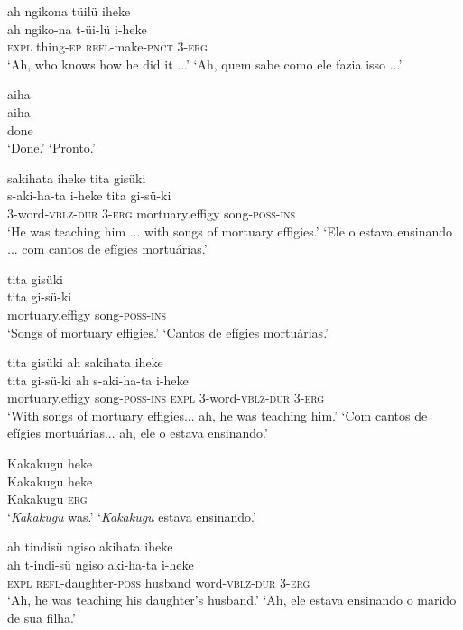 \documentclass[output=paper,
modfonts,nonflat
]{langsci/langscibook}
\begin{document}
\ea  ah ngikona tüilü iheke\\[.3em]
\gll ah ngiko-na t-üi-lü i-heke\\
     \textsc{expl} thing-\textsc{ep} \textsc{refl}-make-\textsc{pnct} 3-\textsc{erg}\\
\glt ‘Ah, who knows how he did it ...’
\glt ‘Ah, quem sabe como ele fazia isso ...’
\z

\ea  aiha\\[.3em]
\gll aiha\\
     done\\
\glt ‘Done.’
\glt ‘Pronto.’
\z

\ea  sakihata iheke tita gisüki\\[.3em]
\gll s-aki-ha-ta i-heke tita gi-sü-ki\\
     3-word-\textsc{vblz}-\textsc{dur} 3-\textsc{erg} mortuary.effigy song-\textsc{poss}-\textsc{ins}\\
\glt ‘He was teaching him ... with songs of mortuary effigies.’
\glt ‘Ele o estava ensinando ... com cantos de efígies mortuárias.’
\z

\ea  tita gisüki\\[.3em]
\gll tita gi-sü-ki\\
     mortuary.effigy song-\textsc{poss}-\textsc{ins}\\
\glt ‘Songs of mortuary effigies.’
\glt ‘Cantos de efígies mortuárias.’
\z

\ea  tita gisüki ah sakihata iheke\\[.3em]
\gll tita gi-sü-ki ah s-aki-ha-ta i-heke\\
     mortuary.effigy song-\textsc{poss}-\textsc{ins} \textsc{expl} 3-word-\textsc{vblz}-\textsc{dur} 3-\textsc{erg}\\
\glt ‘With songs of mortuary effigies... ah, he was teaching him.’
\glt ‘Com cantos de efígies mortuárias... ah, ele o estava ensinando.’
\z

\ea  Kakakugu heke\\[.3em]
\gll Kakakugu heke\\
     Kakakugu \textsc{erg}\\
\glt ‘\textit{Kakakugu} was.’
\glt ‘\textit{Kakakugu} estava ensinando.’
\z

\ea  ah tindisü ngiso akihata iheke\\[.3em]
\gll ah t-indi-sü ngiso aki-ha-ta i-heke\\
     \textsc{expl} \textsc{refl}-daughter-\textsc{poss} husband word-\textsc{vblz}-\textsc{dur} 3-\textsc{erg}\\
\glt ‘Ah, he was teaching his daughter's husband.’
\glt ‘Ah, ele estava ensinando o marido de sua filha.’
\z
\end{document}
